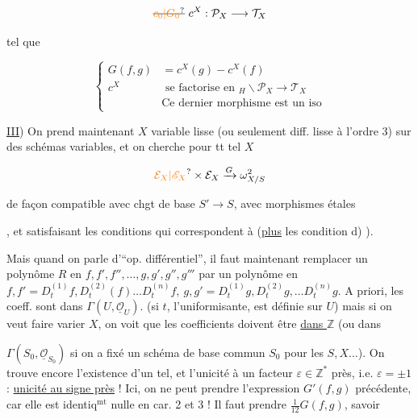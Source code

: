 \[
\deleted{\unsure{c_0|G_0}}\ c^X:\mathcal P_X\longrightarrow\mathcal T_X
\]

tel que

\[
\left\{\begin{aligned}
G(f,g)&=c^X(g)-c^X(f)\\
c^X&\text{ se factorise en } \!{}_H\backslash\mathcal P_X\longrightarrow\mathcal T_X\\
&\text{Ce dernier morphisme est un iso}
\end{aligned}\right.
\]

\uline{III}) On prend maintenant $X$  variable lisse (ou seulement diff. lisse à l'ordre 3) sur des schémas variables, et on cherche pour tt tel $X$

\[
\unsure{\mathcal E_X|\mathscr E_X}\times\mathcal E_X\xrightarrow{G}\omega^2_{X/S}
\]

de façon compatible avec chgt de base $S'\to S$, avec morphismes étales


, et satisfaisant les conditions qui correspondent à  (\uline{plus} les condition d)   ).


Mais quand on parle d'``op. différentiel'', il faut maintenant remplacer un polynôme $R$ en $f,f',f'',\ldots,g,g',g'',g'''$ par un polynôme en $f,f'=D_t^{(1)}f,D_t^{(2)}(f)\ldots D_t^{(n)}f,\ g,g'=D_t^{(1)}g,D_t^{(2)}g,\ldots D_t^{(n)}g$.  A priori, les coeff. sont dans $\Gamma(U,\underline{\mathcal O}_U)$. (si $t$,  l'uniformisante, est définie sur $U$) mais si on  veut faire varier $X$, on voit que les coefficients doivent être \uline{dans $\mathbb Z$} (ou dans

$\Gamma(S_0,\underline{\mathcal O}_{S_0})$ si on a fixé un schéma de base commun $S_0$ pour les $S,X\ldots$). On trouve encore l'existence d'un tel, et l'unicité à un facteur $\varepsilon\in\mathbb Z^*$ près, i.e. $\varepsilon=\pm1$ : \uline{unicité au signe près} ! Ici, on ne peut prendre l'expression $G'(f,g)$ précédente, car elle est identiq$^{\mathrm{mt}}$ nulle en car. 2 et 3 ! Il faut prendre $\frac1{12}G(f,g)$, savoir

